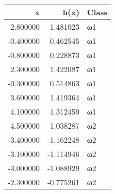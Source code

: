 \begin{tabular}{rrl}
\toprule
x & h(x) & Class \\
\midrule
2.800000 & 1.481023 & ω1 \\
-0.400000 & 0.462545 & ω1 \\
-0.800000 & 0.228873 & ω1 \\
2.300000 & 1.422087 & ω1 \\
-0.300000 & 0.514863 & ω1 \\
3.600000 & 1.419364 & ω1 \\
4.100000 & 1.312459 & ω1 \\
-4.500000 & -1.038287 & ω2 \\
-3.400000 & -1.162248 & ω2 \\
-3.100000 & -1.114946 & ω2 \\
-3.000000 & -1.088929 & ω2 \\
-2.300000 & -0.775261 & ω2 \\
\bottomrule
\end{tabular}
